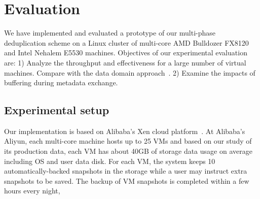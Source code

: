 
\section{Evaluation}
\label{sect:exper}

We have implemented and evaluated a prototype of our multi-phase deduplication scheme on a Linux cluster
of multi-core AMD Bulldozer FX8120 and Intel Nehalem E5530 machines.  Objectives of our experimental evaluation are:
1) Analyze the throughput and effectiveness for a large number of virtual machines.
Compare with the data domain approach~\cite{bottleneck08}.
2) Examine the impacts of buffering during metadata exchange.

\subsection{Experimental setup}

Our implementation is based on Alibaba's Xen cloud platform~\cite{Aliyun,WeiZhangIEEE}.  
At Alibaba's Aliyun, each multi-core machine   hosts  up to 25 VMs and 
based on our study of its production  data,  each VM has about  40GB of storage  data usage on average
including OS and user data disk.  
For each VM, the system keeps 10 automatically-backed snapshots in the storage while
a user may instruct extra snapshots to be saved.
The backup of VM snapshots is completed within a few  hours every night,



